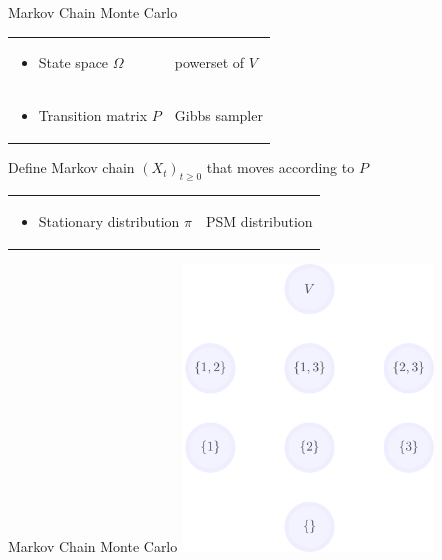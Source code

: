 \documentclass[mathserif]{beamer}
\begin{document}


\begin{frame}{Markov Chain Monte Carlo}
\begin{tabular}{*{2}{@{}l}}
\begin{minipage}{0.45\textwidth}
\begin{itemize}
\item State space $\Omega$
\end{itemize}
\end{minipage} & \color{col1}powerset of $V$\\[1em]
\begin{minipage}{0.45\textwidth}
\begin{itemize}
\item Transition matrix $P$
\end{itemize}
\end{minipage} & \color{col1}Gibbs sampler
\end{tabular}

\vspace{3em}
Define Markov chain $\left(X_t\right)_{t \geq 0}$ that moves according to $P$

\vspace{2em}
\begin{tabular}{*{2}{@{}l}}
\begin{minipage}{0.45\textwidth}
\begin{itemize}
\item Stationary distribution $\pi$
\end{itemize}
\end{minipage} & \color{col1}PSM distribution
\end{tabular}
\end{frame}

\begin{frame}{Markov Chain Monte Carlo}
\vspace{0.5em}
\centering
\includegraphics[height=3in]{figures/lattice_nodes_only.pdf}
\end{frame}
\end{document}
